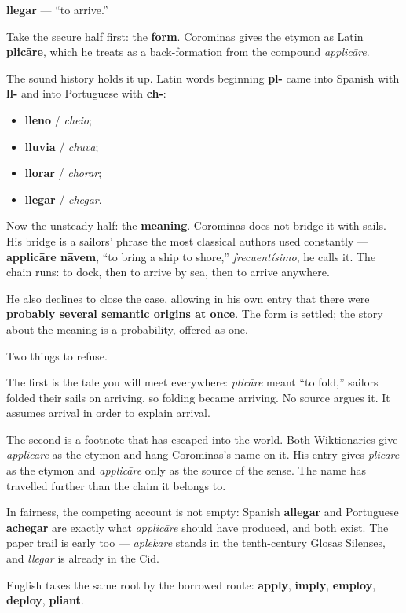 \begin{cousinweb}
\textbf{llegar} — \textquotedblleft{}to arrive.\textquotedblright{}

Take the secure half first: the \textbf{form}. Corominas gives the etymon as Latin \textbf{plicāre}, which he treats as a back-formation from the compound \emph{applicāre}.

The sound history holds it up. Latin words beginning \textbf{pl-} came into Spanish with \textbf{ll-} and into Portuguese with \textbf{ch-}:

\begin{itemize}
\raggedright
  \item \textbf{lleno} / \emph{cheio};
  \item \textbf{lluvia} / \emph{chuva};
  \item \textbf{llorar} / \emph{chorar};
  \item \textbf{llegar} / \emph{chegar}.
\end{itemize}

Now the unsteady half: the \textbf{meaning}. Corominas does not bridge it with sails. His bridge is a sailors' phrase the most classical authors used constantly — \textbf{applicāre nāvem}, \textquotedblleft{}to bring a ship to shore,\textquotedblright{} \emph{frecuentísimo}, he calls it. The chain runs: to dock, then to arrive by sea, then to arrive anywhere.

He also declines to close the case, allowing in his own entry that there were \textbf{probably several semantic origins at once}. The form is settled; the story about the meaning is a probability, offered as one.

Two things to refuse.

The first is the tale you will meet everywhere: \emph{plicāre} meant \textquotedblleft{}to fold,\textquotedblright{} sailors folded their sails on arriving, so folding became arriving. No source argues it. It assumes arrival in order to explain arrival.

The second is a footnote that has escaped into the world. Both Wiktionaries give \emph{applicāre} as the etymon and hang Corominas's name on it. His entry gives \emph{plicāre} as the etymon and \emph{applicāre} only as the source of the sense. The name has travelled further than the claim it belongs to.

In fairness, the competing account is not empty: Spanish \textbf{allegar} and Portuguese \textbf{achegar} are exactly what \emph{applicāre} should have produced, and both exist. The paper trail is early too — \emph{aplekare} stands in the tenth-century Glosas Silenses, and \emph{llegar} is already in the Cid.

English takes the same root by the borrowed route: \textbf{apply}, \textbf{imply}, \textbf{employ}, \textbf{deploy}, \textbf{pliant}.
\end{cousinweb}

